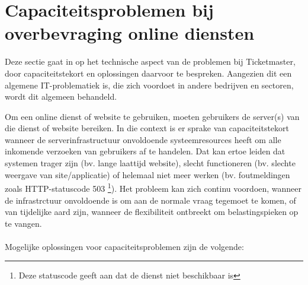 
\section{Capaciteitsproblemen bij overbevraging online diensten}

Deze sectie gaat in op het technische aspect van de problemen bij Ticketmaster,
door capaciteitstekort en oplossingen daarvoor te bespreken. Aangezien dit
een algemene IT-problematiek is, die zich voordoet in andere bedrijven en
sectoren, wordt dit algemeen behandeld. 

Om een online dienst of website te gebruiken, moeten gebruikers de
server(s) van die dienst of website bereiken. In die context is er sprake van
capaciteitstekort wanneer de serverinfrastructuur onvoldoende systeemresources
heeft om alle inkomende verzoeken van gebruikers af te handelen.
Dat kan ertoe leiden dat systemen trager zijn (bv. lange laattijd website),
slecht functioneren (bv. slechte weergave van site/applicatie) of
helemaal niet meer werken (bv. foutmeldingen zoals HTTP-statuscode 503
\footnote{Deze statuscode geeft aan dat de dienst niet beschikbaar is}).
Het probleem kan zich continu voordoen, wanneer de infrastrctuur onvoldoende
is om aan de normale vraag tegemoet te komen,
of van tijdelijke aard zijn, wanneer de flexibiliteit ontbreekt om
belastingspieken op te vangen. \\
\\
Mogelijke oplossingen voor capaciteitsproblemen zijn de volgende:

